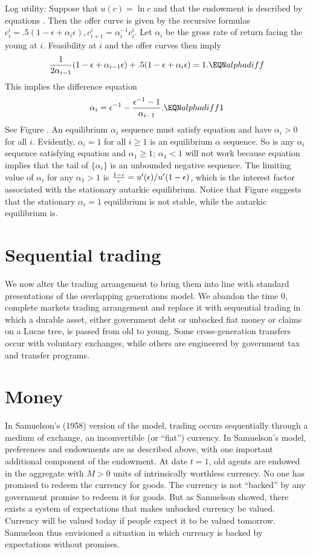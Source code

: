 \medskip
{} \quad Log utility:
Suppose that $u(c) = \ln c$ and that the
endowment is described by equations .   Then the offer curve
is given by the recursive formulas $c^i_i = .5(1 - \epsilon + \alpha_i
\epsilon), c^i_{i+1} = \alpha_i^{-1} c_i^i$.
Let $\alpha_i$ be the gross rate of return facing   the young
at $i$.   Feasibility at $i$ and the offer curves then
imply
$$ {1 \over 2 \alpha_{i-1}} (1 - \epsilon + \alpha_{i-1} \epsilon)
    + .5 (1 -\epsilon + \alpha_i \epsilon) =1. \EQN alphadiff $$
This implies the difference equation
$$ \alpha_i = \epsilon^{-1} - {\epsilon^{-1} -1 \over \alpha_{i-1}}.
  \EQN alphadiff1 $$
See Figure  . %
 An equilibrium $\alpha_i$ sequence must
satisfy  equation  and have $\alpha_i > 0$ for
all $i$.   Evidently, $\alpha_i =1$ for all $i\geq 1$ is
an equilibrium $\alpha$ sequence.   So is any $\alpha_i$ sequence  satisfying
equation  and $\alpha_1 \geq 1$; $\alpha_1 < 1$ will not work
because equation
 implies that the tail of $\{\alpha_i\}$ is an unbounded
negative sequence.  The limiting value of $\alpha_i$ for any
$\alpha_1 >1  $ is ${1-\epsilon \over \epsilon} = u'(\epsilon) /
u'(1-\epsilon)$,
which is the interest factor associated with the stationary
autarkic equilibrium.   Notice that Figure  suggests that   the stationary
$\alpha_i=1$ equilibrium is not stable, while the autarkic equilibrium is.


\section{Sequential trading}

  We now alter the trading arrangement to bring them
into line with standard presentations of the overlapping
generations model.   We abandon the time $0$, complete markets
 trading  arrangement and replace it with sequential
trading in which a durable asset, either government debt or unbacked fiat money
or claims on a Lucas tree, is passed from old to young.
Some cross-generation transfers occur with voluntary exchanges,
 while others are engineered by government
tax and transfer programs.

\section{Money}
%
 In  Samuelson's (1958)  version of the model, trading occurs
 sequentially through a medium of exchange, an
inconvertible (or ``fiat'') currency.
   In Samuelson's model, preferences and  endowments
are as described above, with one important additional component of the
endowment.
At date $t=1$, old agents are endowed in the aggregate
with $M >0$ units of intrinsically worthless currency.
No one has promised to redeem the currency for goods.
The currency is  not ``backed'' by any government promise to redeem it
for goods.  But as
Samuelson showed, there  exists a   system of expectations that  makes
unbacked currency be valued. Currency will be valued today if people expect it
to be valued tomorrow.  Samuelson thus envisioned a situation in which
currency is backed
by expectations without promises.

